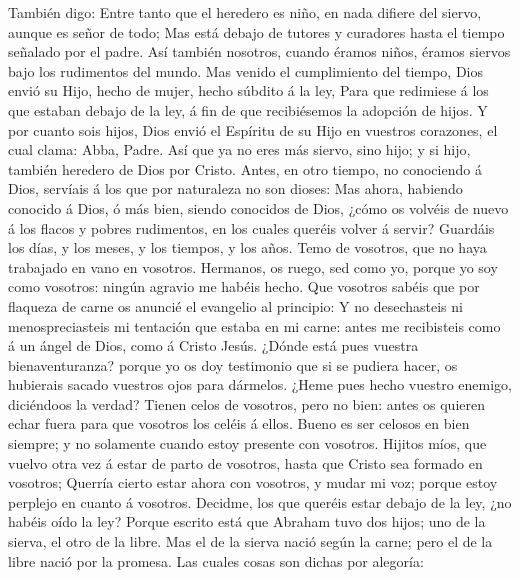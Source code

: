  También digo: Entre tanto que el heredero es niño, en
nada difiere del siervo, aunque es señor de todo;  Mas
está debajo de tutores y curadores hasta el tiempo señalado por el
padre.  Así también nosotros, cuando éramos niños, éramos
siervos bajo los rudimentos del mundo.  Mas venido el
cumplimiento del tiempo, Dios envió su Hijo, hecho de mujer, hecho
súbdito á la ley,  Para que redimiese á los que estaban
debajo de la ley, á fin de que recibiésemos la adopción de hijos.
 Y por cuanto sois hijos, Dios envió el Espíritu de su
Hijo en vuestros corazones, el cual clama: Abba, Padre. 
Así que ya no eres más siervo, sino hijo; y si hijo, también heredero de
Dios por Cristo.  Antes, en otro tiempo, no conociendo á
Dios, servíais á los que por naturaleza no son dioses: 
Mas ahora, habiendo conocido á Dios, ó más bien, siendo conocidos de
Dios, ¿cómo os volvéis de nuevo á los flacos y pobres rudimentos, en los
cuales queréis volver á servir?  Guardáis los días, y los
meses, y los tiempos, y los años.  Temo de vosotros, que
no haya trabajado en vano en vosotros.  Hermanos, os
ruego, sed como yo, porque yo soy como vosotros: ningún agravio me
habéis hecho.  Que vosotros sabéis que por flaqueza de
carne os anuncié el evangelio al principio:  Y no
desechasteis ni menospreciasteis mi tentación que estaba en mi carne:
antes me recibisteis como á un ángel de Dios, como á Cristo Jesús.
 ¿Dónde está pues vuestra bienaventuranza? porque yo os
doy testimonio que si se pudiera hacer, os hubierais sacado vuestros
ojos para dármelos.  ¿Heme pues hecho vuestro enemigo,
diciéndoos la verdad?  Tienen celos de vosotros, pero no
bien: antes os quieren echar fuera para que vosotros los celéis á ellos.
 Bueno es ser celosos en bien siempre; y no solamente
cuando estoy presente con vosotros.  Hijitos míos, que
vuelvo otra vez á estar de parto de vosotros, hasta que Cristo sea
formado en vosotros;  Querría cierto estar ahora con
vosotros, y mudar mi voz; porque estoy perplejo en cuanto á vosotros.
 Decidme, los que queréis estar debajo de la ley, ¿no
habéis oído la ley?  Porque escrito está que Abraham tuvo
dos hijos; uno de la sierva, el otro de la libre.  Mas el
de la sierva nació según la carne; pero el de la libre nació por la
promesa.  Las cuales cosas son dichas por alegoría:
